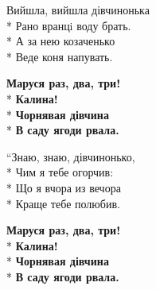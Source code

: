 \medskip

\begin{minipage}{\linewidth}
Вийшла, вийшла дівчинонька\\*
Рано вранцi воду брать.\\*
А за нею козаченько\\*
Веде коня напувать.\\
\end{minipage}\par\medskip\nobreak

\medskip

\begin{minipage}{\linewidth}
\hspace*{1.5em}\textbf{Маруся раз, два, три!}\\*
\hspace*{1.5em}\textbf{Калина!}\\*
\hspace*{1.5em}\textbf{Чорнявая дівчина}\\*
\hspace*{1.5em}\textbf{В саду ягоди рвала.}\\
\end{minipage}\par\medskip\nobreak

\medskip

\begin{minipage}{\linewidth}
“Знаю, знаю, дівчинонько,\\*
Чим я тебе огорчив:\\*
Що я вчора из вечора\\*
Краще тебе полюбив.\\
\end{minipage}\par\medskip\nobreak

\medskip

\begin{minipage}{\linewidth}
\hspace*{1.5em}\textbf{Маруся раз, два, три!}\\*
\hspace*{1.5em}\textbf{Калина!}\\*
\hspace*{1.5em}\textbf{Чорнявая дівчина}\\*
\hspace*{1.5em}\textbf{В саду ягоди рвала.}\\
\end{minipage}\par\medskip\nobreak

